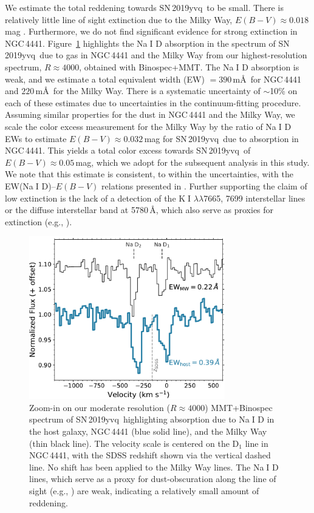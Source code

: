 \documentclass[twocolumn]{aastex63}
\def\ion#1#2{#1$\;${\footnotesize\rm{#2}}\relax}
\newcommand{\frommb}[1]{{\color{purple} fromMB: {#1}}}
\newcommand{\sn}{SN\,2019yvq}
\begin{document}
We estimate the total reddening towards \sn\ to be small. There is relatively
little line of sight extinction due to the Milky Way, $E(B-V) \approx
0.018$\,mag \citep{Schlafly11, Schlegel98}. Furthermore, we do not find
significant evidence for strong extinction in NGC\,4441. Figure~\ref{fig:NaD}
highlights the \ion{Na}{I} D absorption in the spectrum of \sn\ due to gas in
NGC\,4441 and the Milky Way from our highest-resolution spectrum, $R \approx
4000$, obtained with Binospec+MMT. The \ion{Na}{I} D absorption is weak, and
we estimate a total equivalent width (EW) $= 390$\,m\AA\ for NGC\,4441 and
$220$\,m\AA\ for the Milky Way. There is a systematic uncertainty of
$\sim$10\% on each of these estimates due to uncertainties in the
continuum-fitting procedure. Assuming similar properties for the dust in
NGC\,4441 and the Milky Way, we scale the color excess measurement for the
Milky Way by the ratio of \ion{Na}{I} D EWs to estimate $E(B-V) \approx
0.032$\,mag for \sn\ due to absorption in NGC\,4441. This yields a total color
excess towards \sn\ of $E(B-V) \approx 0.05$\,mag, which we adopt for the
subsequent analysis in this study. We note that this estimate is consistent,
to within the uncertainties, with the EW(\ion{Na}{I} D)--$E(B-V)$ relations
presented in \citet{Poznanski12}. Further supporting the claim of low
extinction is the lack of a detection of the \ion{K}{I} $\lambda\lambda$7665,
7699 interstellar lines or the diffuse interstellar band at 5780\,\AA, which
also serve as proxies for extinction (e.g., \citealt{Phillips13}).

\begin{figure}
    \centering
    \includegraphics[width=3.35in]{./figures/NaD.pdf}
    \caption{Zoom-in on our moderate resolution ($R \approx 4000$)
    MMT+Binospec spectrum of \sn\ highlighting absorption due to \ion{Na}{I}
    D in the host galaxy, NGC\,4441 (blue solid line), and the Milky Way
    (thin black line). The velocity scale is centered on the D$_1$ line in
    NGC\,4441, with the SDSS redshift shown via the vertical dashed line. No
    shift has been applied to the Milky Way lines. The \ion{Na}{I} D lines,
    which serve as a proxy for dust-obscuration along the line of sight
    (e.g., \citealt{Poznanski12,Phillips13}) are weak, indicating a
    relatively small amount of reddening.}
    \label{fig:NaD}
\end{figure}
\end{document}
